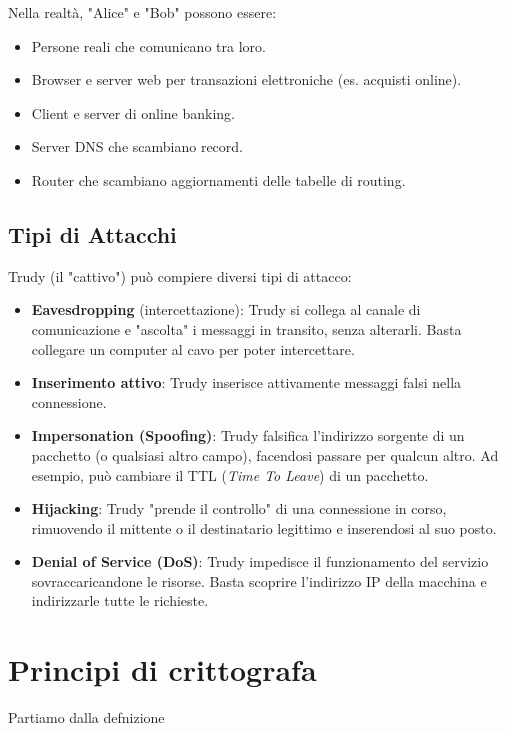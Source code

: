 Nella realtà, "Alice" e "Bob" possono essere:
\begin{itemize}
    \item Persone reali che comunicano tra loro.
    \item Browser e server web per transazioni elettroniche (es. acquisti online).
    \item Client e server di online banking.
    \item Server DNS che scambiano record.
    \item Router che scambiano aggiornamenti delle tabelle di routing.
\end{itemize}

\subsection{Tipi di Attacchi}
Trudy (il "cattivo") può compiere diversi tipi di attacco:
\begin{itemize}
    \item \textbf{Eavesdropping} (intercettazione): Trudy si collega al canale di comunicazione e "ascolta" i messaggi in transito, senza alterarli. Basta collegare un computer al cavo per poter intercettare.
    \item \textbf{Inserimento attivo}: Trudy inserisce attivamente messaggi falsi nella connessione.
    \item \textbf{Impersonation (Spoofing)}: Trudy falsifica l'indirizzo sorgente di un pacchetto (o qualsiasi altro campo), facendosi passare per qualcun altro. Ad esempio, può cambiare il TTL (\textit{Time To Leave}) di un pacchetto.
    \item \textbf{Hijacking}: Trudy "prende il controllo" di una connessione in corso, rimuovendo il mittente o il destinatario legittimo e inserendosi al suo posto.
    \item \textbf{Denial of Service (DoS)}: Trudy impedisce il funzionamento del servizio sovraccaricandone le risorse. Basta scoprire l'indirizzo IP della macchina e indirizzarle tutte le richieste.
\end{itemize}

\section{Principi di crittografa}
Partiamo dalla defnizione


